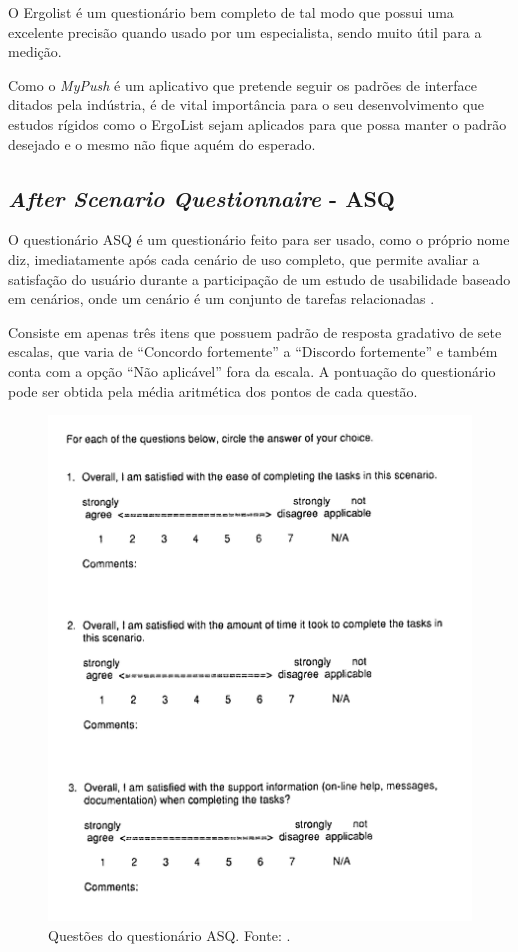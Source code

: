       O Ergolist é um questionário bem completo de tal modo que possui uma excelente precisão quando usado por um especialista,
      sendo muito útil para a medição.	

      Como o \textit{MyPush} é um aplicativo que pretende seguir os padrões de interface ditados pela indústria, é de vital
      importância para o seu desenvolvimento que estudos rígidos como o ErgoList sejam aplicados para que possa manter o 
      padrão desejado e o mesmo não fique aquém do esperado.
    
    \subsection{\textit{After Scenario Questionnaire} - ASQ}
    
      O questionário ASQ é um questionário feito para ser usado, como o próprio nome diz, imediatamente após cada cenário de uso
      completo, que permite avaliar a satisfação do usuário durante a participação de um estudo de usabilidade baseado em cenários,
      onde um cenário é um conjunto de tarefas relacionadas \cite{lewis91}.
      
      Consiste em apenas três itens que possuem padrão de resposta gradativo de sete escalas, que varia de “Concordo fortemente” 
      a “Discordo fortemente” e também conta com a opção “Não aplicável” fora da escala. A pontuação do questionário pode ser
      obtida pela média aritmética dos pontos de cada questão.
      
      \begin{figure}[h]
	\centering
	\includegraphics[scale=0.28]{editaveis/figuras/asq_questions}
	\caption[Questões do questionário ASQ]{Questões do questionário ASQ. Fonte: \cite{lewis91}.}
	\label{asq_questions}
      \end{figure}
      
